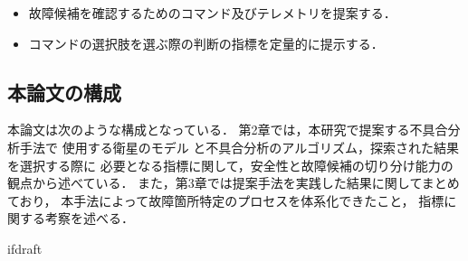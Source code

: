\documentclass[11pt]{jsreport}
\begin{document}
\begin{itemize}
  \item 故障候補を確認するためのコマンド及びテレメトリを提案する．
  \item コマンドの選択肢を選ぶ際の判断の指標を定量的に提示する．
\end{itemize}

\subsection{本論文の構成}
本論文は次のような構成となっている．
第2章では，本研究で提案する不具合分析手法で
使用する衛星のモデル%
と不具合分析のアルゴリズム，探索された結果を選択する際に
必要となる指標に関して，安全性と故障候補の切り分け能力の観点から述べている．
また，第3章では提案手法を実践した結果に関してまとめており，
本手法によって故障箇所特定のプロセスを体系化できたこと，
指標に関する考察を述べる．

\expandafter\ifx\csname ifdraft\endcsname\relax
\end{document}
